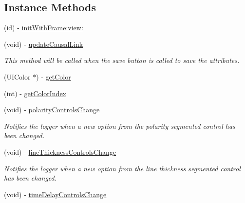 \subsection*{Instance Methods}
\begin{DoxyCompactItemize}
\item 
(id) -\/ \hyperlink{interface_causal_link_edit_menu_view_ad1475d40e606d4f009f89321944e3678}{init\-With\-Frame\-:view\-:}
\item 
\hypertarget{interface_causal_link_edit_menu_view_ae23c342ee9fb7ce665b7354c3fb4b222}{(void) -\/ \hyperlink{interface_causal_link_edit_menu_view_ae23c342ee9fb7ce665b7354c3fb4b222}{update\-Causal\-Link}}\label{interface_causal_link_edit_menu_view_ae23c342ee9fb7ce665b7354c3fb4b222}

\begin{DoxyCompactList}\small\item\em This method will be called when the save button is called to save the attributes. \end{DoxyCompactList}\item 
(U\-I\-Color $\ast$) -\/ \hyperlink{interface_causal_link_edit_menu_view_ae738ae72f04ce87c6338636677f00d29}{get\-Color}
\item 
(int) -\/ \hyperlink{interface_causal_link_edit_menu_view_a6dbd080e76ce4ee3d6977c62f72e49b4}{get\-Color\-Index}
\item 
\hypertarget{interface_causal_link_edit_menu_view_aa58a2d9c88390d1274785ab09ac523f0}{(void) -\/ \hyperlink{interface_causal_link_edit_menu_view_aa58a2d9c88390d1274785ab09ac523f0}{polarity\-Controls\-Change}}\label{interface_causal_link_edit_menu_view_aa58a2d9c88390d1274785ab09ac523f0}

\begin{DoxyCompactList}\small\item\em Notifies the logger when a new option from the polarity segmented control has been changed. \end{DoxyCompactList}\item 
\hypertarget{interface_causal_link_edit_menu_view_ab36ea37c4278dd582eecb569ec96cd4e}{(void) -\/ \hyperlink{interface_causal_link_edit_menu_view_ab36ea37c4278dd582eecb569ec96cd4e}{line\-Thickness\-Controls\-Change}}\label{interface_causal_link_edit_menu_view_ab36ea37c4278dd582eecb569ec96cd4e}

\begin{DoxyCompactList}\small\item\em Notifies the logger when a new option from the line thickness segmented control has been changed. \end{DoxyCompactList}\item 
\hypertarget{interface_causal_link_edit_menu_view_a1205630474a5a56a221ede7c02b97d16}{(void) -\/ \hyperlink{interface_causal_link_edit_menu_view_a1205630474a5a56a221ede7c02b97d16}{time\-Delay\-Controls\-Change}}\label{interface_causal_link_edit_menu_view_a1205630474a5a56a221ede7c02b97d16}


\end{DoxyCompactItemize}
